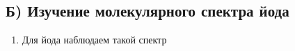 \documentclass[14pt, a4paper]{extarticle}
\begin{document}
 \subsection*{Б) Изучение молекулярного спектра йода}
 \begin{enumerate}
 	\item Для йода наблюдаем такой спектр
 	
% 		
% 	 	 
% 	 	
 		

\end{enumerate}
\end{document}
